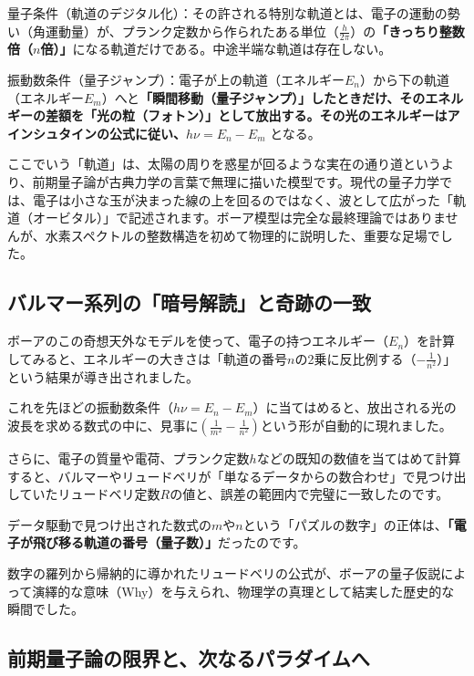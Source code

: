 量子条件（軌道のデジタル化）：その許される特別な軌道とは、電子の運動の勢い（角運動量）が、プランク定数から作られたある単位（\(\frac{h}{2\pi}\)）の\textbf{「きっちり整数倍（\(n\)倍）」}になる軌道だけである。中途半端な軌道は存在しない。

振動数条件（量子ジャンプ）：電子が上の軌道（エネルギー\(E_n\)）から下の軌道（エネルギー\(E_m\)）へと\textbf{「瞬間移動（量子ジャンプ）」したときだけ、そのエネルギーの差額を「光の粒（フォトン）」として放出する。その光のエネルギーはアインシュタインの公式に従い、\(h\nu = E_n - E_m\)} となる。

ここでいう「軌道」は、太陽の周りを惑星が回るような実在の通り道というより、前期量子論が古典力学の言葉で無理に描いた模型です。現代の量子力学では、電子は小さな玉が決まった線の上を回るのではなく、波として広がった「軌道（オービタル）」で記述されます。ボーア模型は完全な最終理論ではありませんが、水素スペクトルの整数構造を初めて物理的に説明した、重要な足場でした。

\subsection{バルマー系列の「暗号解読」と奇跡の一致}

ボーアのこの奇想天外なモデルを使って、電子の持つエネルギー（\(E_n\)）を計算してみると、エネルギーの大きさは「軌道の番号\(n\)の2乗に反比例する（\(-\frac{1}{n^2}\)）」という結果が導き出されました。

これを先ほどの振動数条件（\(h\nu = E_n - E_m\)）に当てはめると、放出される光の波長を求める数式の中に、見事に\(\left( \frac{1}{m^2} - \frac{1}{n^2} \right)\)という形が自動的に現れました。

さらに、電子の質量や電荷、プランク定数\(h\)などの既知の数値を当てはめて計算すると、バルマーやリュードベリが「単なるデータからの数合わせ」で見つけ出していたリュードベリ定数\(R\)の値と、誤差の範囲内で完璧に一致したのです。

データ駆動で見つけ出された数式の\(m\)や\(n\)という「パズルの数字」の正体は、\textbf{「電子が飛び移る軌道の番号（量子数）」}だったのです。

数字の羅列から帰納的に導かれたリュードベリの公式が、ボーアの量子仮説によって演繹的な意味（Why）を与えられ、物理学の真理として結実した歴史的な瞬間でした。

\subsection{前期量子論の限界と、次なるパラダイムへ}

